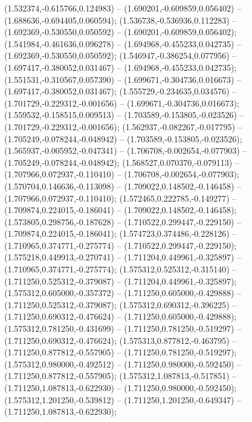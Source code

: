  (1.532374,-0.615766,0.124983) -- (1.690201,-0.609859,0.056402) -- (1.688636,-0.694405,0.060594);
 (1.536738,-0.536936,0.112283) -- (1.692369,-0.530550,0.050592) -- (1.690201,-0.609859,0.056402);
 (1.541984,-0.461636,0.096278) -- (1.694968,-0.455233,0.042735) -- (1.692369,-0.530550,0.050592);
 (1.546947,-0.386254,0.077956) -- (1.697417,-0.380052,0.031467) -- (1.694968,-0.455233,0.042735);
 (1.551531,-0.310567,0.057390) -- (1.699671,-0.304736,0.016673) -- (1.697417,-0.380052,0.031467);
 (1.555729,-0.234635,0.034576) -- (1.701729,-0.229312,-0.001656) -- (1.699671,-0.304736,0.016673);
 (1.559532,-0.158515,0.009513) -- (1.703589,-0.153805,-0.023526) -- (1.701729,-0.229312,-0.001656);
 (1.562937,-0.082267,-0.017795) -- (1.705249,-0.078244,-0.048942) -- (1.703589,-0.153805,-0.023526);
 (1.565937,-0.005952,-0.047341) -- (1.706708,-0.002654,-0.077903) -- (1.705249,-0.078244,-0.048942);
 (1.568527,0.070370,-0.079113) -- (1.707966,0.072937,-0.110410) -- (1.706708,-0.002654,-0.077903);
 (1.570704,0.146636,-0.113098) -- (1.709022,0.148502,-0.146458) -- (1.707966,0.072937,-0.110410);
 (1.572465,0.222785,-0.149277) -- (1.709874,0.224015,-0.186041) -- (1.709022,0.148502,-0.146458);
 (1.573805,0.298756,-0.187628) -- (1.710522,0.299447,-0.229150) -- (1.709874,0.224015,-0.186041);
 (1.574723,0.374486,-0.228126) -- (1.710965,0.374771,-0.275774) -- (1.710522,0.299447,-0.229150);
 (1.575218,0.449913,-0.270741) -- (1.711204,0.449961,-0.325897) -- (1.710965,0.374771,-0.275774);
 (1.575312,0.525312,-0.315140) -- (1.711250,0.525312,-0.379087) -- (1.711204,0.449961,-0.325897);
 (1.575312,0.605000,-0.357372) -- (1.711250,0.605000,-0.429888) -- (1.711250,0.525312,-0.379087);
 (1.575312,0.690312,-0.396225) -- (1.711250,0.690312,-0.476624) -- (1.711250,0.605000,-0.429888);
 (1.575312,0.781250,-0.431699) -- (1.711250,0.781250,-0.519297) -- (1.711250,0.690312,-0.476624);
 (1.575313,0.877812,-0.463795) -- (1.711250,0.877812,-0.557905) -- (1.711250,0.781250,-0.519297);
 (1.575312,0.980000,-0.492512) -- (1.711250,0.980000,-0.592450) -- (1.711250,0.877812,-0.557905);
 (1.575312,1.087813,-0.517851) -- (1.711250,1.087813,-0.622930) -- (1.711250,0.980000,-0.592450);
 (1.575312,1.201250,-0.539812) -- (1.711250,1.201250,-0.649347) -- (1.711250,1.087813,-0.622930);
